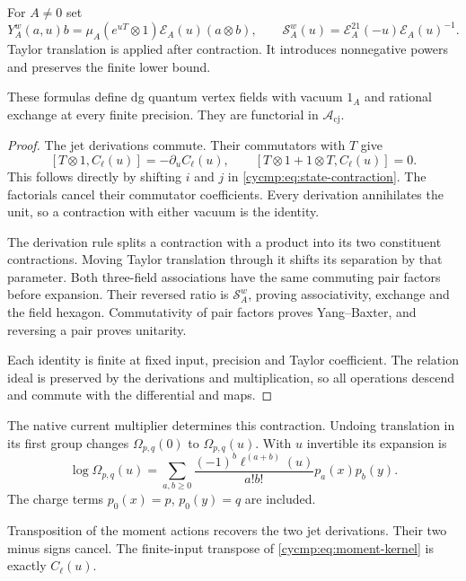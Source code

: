 For $A\ne0$ set
\begin{equation}\label{cycmp:eq:state-fields}
 Y_A^w(a,u)b=\mu_A(e^{uT}\otimes1)\mathcal E_A(u)(a\otimes b),
 \qquad
 \mathcal S_A^w(u)=\mathcal E_A^{21}(-u)\mathcal E_A(u)^{-1}.
\end{equation}
Taylor translation is applied after contraction. It introduces
nonnegative powers and preserves the finite lower bound.

\begin{lemma}\label{cycmp:lem:state-fields}
These formulas define dg quantum vertex fields with vacuum $1_A$
and rational exchange at every finite precision. They are functorial
in $\mathcal A_{\mathrm{cj}}$.
\end{lemma}

\begin{proof}
The jet derivations commute. Their commutators with $T$ give
\[
 [T\otimes1,C_\ell(u)]=-\partial_uC_\ell(u),\qquad
 [T\otimes1+1\otimes T,C_\ell(u)]=0.
\]
This follows directly by shifting $i$ and $j$ in
\eqref{cycmp:eq:state-contraction}. The factorials cancel their
commutator coefficients. Every derivation annihilates the unit,
so a contraction with either vacuum is the identity.

The derivation rule splits a contraction with a product into its
two constituent contractions. Moving Taylor translation through it
shifts its separation by that parameter. Both three-field
associations have the same commuting pair factors before expansion.
Their reversed ratio is $\mathcal S_A^w$, proving associativity,
exchange and the field hexagon. Commutativity of pair factors proves
Yang--Baxter, and reversing a pair proves unitarity.

Each identity
is finite at fixed input, precision and Taylor coefficient.
The relation ideal is preserved by the derivations and multiplication,
so all operations descend and commute with the differential and maps.
\end{proof}

The native current multiplier determines this contraction. Undoing
translation in its first group changes $\Omega_{p,q}(0)$ to
$\Omega_{p,q}(u)$. With $u$ invertible its expansion is
\begin{equation}\label{cycmp:eq:moment-kernel}
 \log\Omega_{p,q}(u)=\sum_{a,b\ge0}
       \frac{(-1)^b\ell^{(a+b)}(u)}{a!b!}p_a(x)p_b(y).
\end{equation}
The charge terms $p_0(x)=p$, $p_0(y)=q$ are included.

Transposition of the moment actions recovers the two jet derivations.
Their two minus signs cancel. The finite-input transpose of
\eqref{cycmp:eq:moment-kernel} is exactly $C_\ell(u)$.

